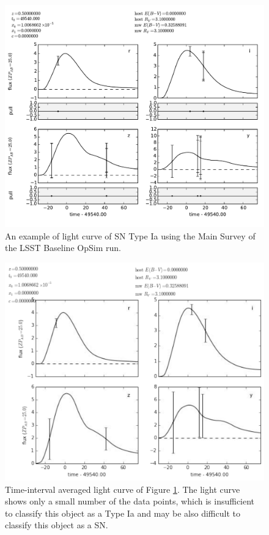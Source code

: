 \begin{figure}[tbh!]
\includegraphics[angle=0,width=0.99\hsize:,clip]{figs/SN_309_lc.pdf}
\caption{An example of light curve of SN Type Ia using the Main Survey of the LSST Baseline OpSim
run.
}
\label{fig:SNIaLCopsimmain}
\end{figure}

\begin{figure}[tbh!]
\includegraphics[angle=0,width=0.99\hsize:,clip]{figs/SN_309_lcavg.pdf}
\caption{Time-interval averaged light curve of Figure \ref{fig:SNIaLCopsimmain}.
The light curve shows only a small number of the data points, which is insufficient
to classify this object as a Type Ia and may be also difficult to classify this object as
a SN. 
}
\label{fig:SNIaLCopsimmain2}
\end{figure}

